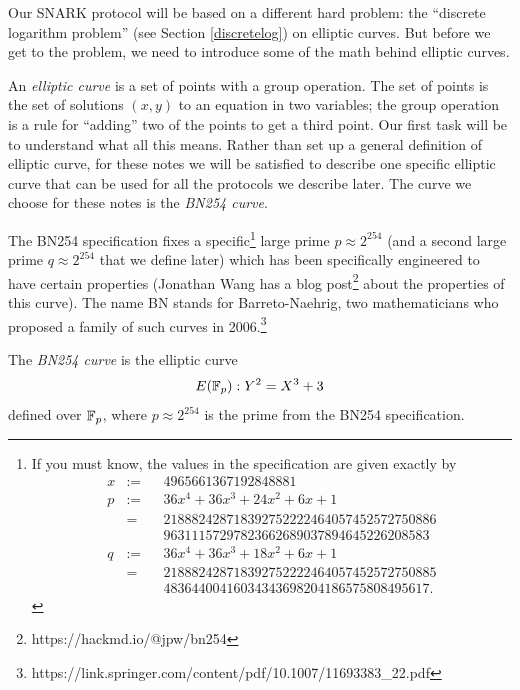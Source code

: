Our SNARK protocol will be based on a different hard problem: the
``discrete logarithm problem''
(see Section \ref{discretelog}) on elliptic curves. But
before we get to the problem, we need to introduce some of the math
behind elliptic curves.

An \emph{elliptic curve} is a set of points with a group operation. The
set of points is the set of solutions \((x,y)\) to an equation in two
variables; the group operation is a rule for ``adding'' two of the
points to get a third point. Our first task will be to understand what
all this means. Rather than set up a general definition of elliptic
curve, for these notes we will be satisfied to describe one specific
elliptic curve that can be used for all the protocols we describe later.
The curve we choose for these notes is the \emph{BN254 curve}.

The BN254 specification fixes a specific\footnote{If you must know, the
 values in the specification are given exactly by \[\begin{aligned}
 x & := & & 4965661367192848881 \\
 p & := & & 36x^{4} + 36x^{3} + 24x^{2} + 6x + 1 \\
 & = & & 218882428718392752222464057452572750886 \\
 & & & 96311157297823662689037894645226208583 \\
 q & := & & 36x^{4} + 36x^{3} + 18x^{2} + 6x + 1 \\
 & = & & 218882428718392752222464057452572750885 \\
 & & & 48364400416034343698204186575808495617.
 \end{aligned}\]} 
large prime \(p \approx 2^{254}\) (and a second large
prime \(q \approx 2^{254}\) that we define later) which has been
specifically engineered to have certain properties (Jonathan Wang has a
blog post\footnote{https://hackmd.io/@jpw/bn254} about the properties of
this curve). The name BN stands for Barreto-Naehrig, two mathematicians
who proposed a family of such curves in 2006.\footnote{https://link.springer.com/content/pdf/10.1007/11693383\_22.pdf}

\begin{definition}
The \emph{BN254 curve} is the elliptic curve
\begin{equation}
\label{bn254eqn}
E(\mathbb{F}_p) : Y^2 = X^3 + 3
\end{equation}
defined over $\mathbb{F}_p$, where $p \approx 2^{254}$
is the prime from the BN254 specification.
\end{definition}

